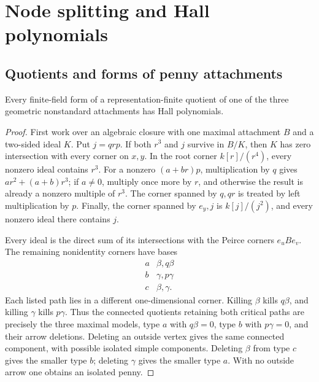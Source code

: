\section{Node splitting and Hall polynomials}\label{sec:global}
\subsection{Quotients and forms of penny attachments}
\begin{lemma}\label{lem:attachment-quotients}
Every finite-field form of a representation-finite quotient of one of the three geometric nonstandard attachments has Hall polynomials.
\end{lemma}
\begin{proof}
First work over an algebraic closure with one maximal attachment $B$ and a two-sided ideal $K$. Put $j=qrp$. If both $r^3$ and $j$ survive in $B/K$, then $K$ has zero intersection with every corner on $x,y$. In the root corner $k[r]/(r^4)$, every nonzero ideal contains $r^3$. For a nonzero $(a+br)p$, multiplication by $q$ gives $ar^2+(a+b)r^3$; if $a\ne0$, multiply once more by $r$, and otherwise the result is already a nonzero multiple of $r^3$. The corner spanned by $q,qr$ is treated by left multiplication by $p$. Finally, the corner spanned by $e_y,j$ is $k[j]/(j^2)$, and every nonzero ideal there contains $j$.

Every ideal is the direct sum of its intersections with the Peirce corners $e_uBe_v$. The remaining nonidentity corners have bases
\[
\begin{array}{c|l}
 a&\beta, q\beta\\
 b&\gamma, p\gamma\\
 c&\beta, \gamma.
\end{array}
\]
Each listed path lies in a different one-dimensional corner. Killing $\beta$ kills $q\beta$, and killing $\gamma$ kills $p\gamma$. Thus the connected quotients retaining both critical paths are precisely the three maximal models, type $a$ with $q\beta=0$, type $b$ with $p\gamma=0$, and their arrow deletions. Deleting an outside vertex gives the same connected component, with possible isolated simple components. Deleting $\beta$ from type $c$ gives the smaller type $b$; deleting $\gamma$ gives the smaller type $a$. With no outside arrow one obtains an isolated penny.


\end{proof}
